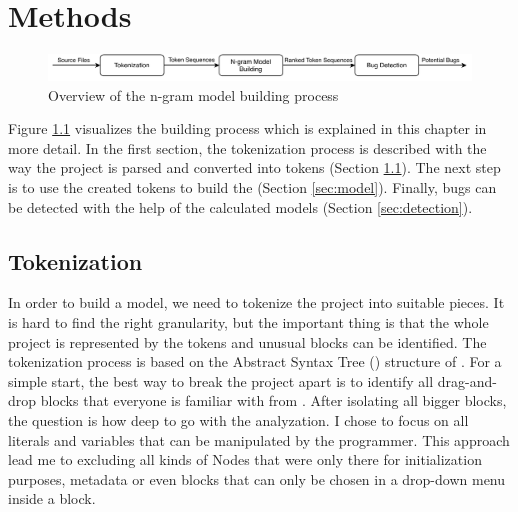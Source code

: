 \chapter{Methods}\label{chap:methods}

\begin{figure}[hbtp]
\centering
\includegraphics[scale=0.75]{images/Overview.pdf}
\caption{Overview of the n-gram model building process}
\label{fig:overview}
\end{figure}

Figure \ref{fig:overview} visualizes the \ngram{} building process which is explained in this chapter in more detail. In the first section, the tokenization process is described with the way the \scratch{} project is parsed and converted into tokens (Section \ref{sec:tokenization}). The next step is to use the created tokens to build the  (Section \ref{sec:model}). Finally, bugs can be detected with the help of the calculated models (Section \ref{sec:detection}).

\section{Tokenization}\label{sec:tokenization}
In order to build a model, we need to tokenize the \scratch{} project into suitable pieces. It is hard to find the right granularity, but the important thing is that the whole project is represented by the tokens and unusual blocks can be identified. The tokenization process is based on the Abstract Syntax Tree (\AST{}) structure of \litterbox{}. For a simple start, the best way to break the project apart is to identify all drag-and-drop blocks that everyone is familiar with from \scratch{}. After isolating all bigger blocks, the question is how deep to go with the analyzation. I chose to focus on all literals and variables that can be manipulated by the \scratch{} programmer. This approach lead me to excluding all kinds of \AST{}Nodes that were only there for initialization purposes, metadata or even blocks that can only be chosen in a drop-down menu inside a block.  

